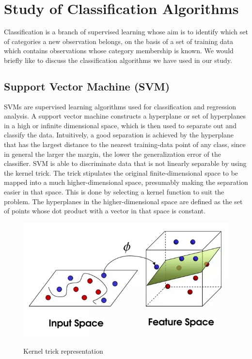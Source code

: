 \chapter{Study of Classification Algorithms} \label{Study of Classification Algorithms}
\noindent Classification is a branch of supervised learning whose aim is to identify which set of categories a new observation belongs, on the basis of a set of training data which contains observations whose category membership is known. We would briefly like to discuss the classification algorithms we have used in our study.


\section{ Support Vector Machine (SVM)} \label{ Support Vector Machine (SVM)}
\noindent SVMs are supervised learning algorithms used for classification and regression analysis. A support vector machine constructs a hyperplane or set of hyperplanes in a high or infinite dimensional space, which is then used to separate out and classify the data. Intuitively, a good separation is achieved by the hyperplane that has the largest distance to the nearest training-data point of any class, since in general the larger the margin, the lower the generalization error of the classifier. SVM is able to discriminate data that is not linearly separable by using the kernel trick. 
\noindent The trick stipulates the original finite-dimensional space to be mapped into a much higher-dimensional space, presumably making the separation easier in that space. This is done by selecting a kernel function to suit the problem. The hyperplanes in the higher-dimensional space are defined as the set of points whose dot product with a vector in that space is constant.

\begin{figure}[H]
\centering
{\includegraphics[scale=0.79]{ktr.png}}
\caption{Kernel trick representation}
\end{figure}


